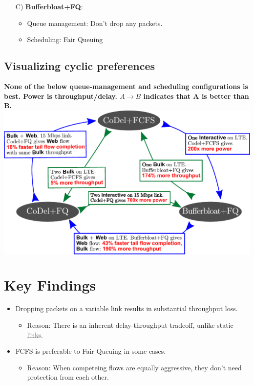 {\begin{multicols}{2}
\begin{enumerate}
\item[C)] {\bf Bufferbloat+FQ}:
  \begin{itemize}
  \item Queue management: Don't drop any packets.
  \item Scheduling: Fair Queuing
  \end{itemize}

\end{enumerate}

\subsection*{Visualizing cyclic preferences}
\textbf{None of the below queue-management and scheduling configurations is best. Power is throughput/delay. $A\to B$ indicates that A is better than B.} \\
\includegraphics[width=\columnwidth]{fig.pdf}

\section*{Key Findings}
\begin{itemize}
\item Dropping packets on a variable link results in substantial throughput loss.
      \begin{itemize}
      \item Reason: There is an inherent delay-throughput tradeoff, unlike static links.
      \end{itemize} 
 
\item FCFS is preferable to Fair Queuing in some cases.
      \begin{itemize}
      \item Reason: When competeing flows are equally aggressive, they don't need protection from each other.
      \end{itemize}


\end{itemize}
\end{multicols}}
